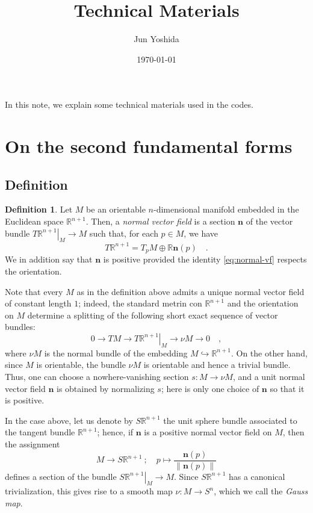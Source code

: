 \documentclass[pdftex,a4paper,12pt]{scrartcl}
\title{Technical Materials}
\author{Jun Yoshida}
\date{\today}
\theoremstyle{plain}
\theoremstyle{definition}
\newtheorem{definition}{Definition}
\theoremstyle{remark}
\numberwithin{equation}{section}
\begin{document}
\maketitle

In this note, we explain some technical materials used in the codes.

\tableofcontents

\section{On the second fundamental forms}

\subsection{Definition}

\begin{definition}
Let $M$ be an orientable $n$-dimensional manifold embedded in the Euclidean space $\mathbb R^{n+1}$.
Then, a \emph{normal vector field} is a section $\mathbf n$ of the vector bundle $\left.T\mathbb R^{n+1}\right|_M\to M$ such that, for each $p\in M$, we have
\begin{equation}
\label{eq:normal-vf}
T\mathbb R^{n+1}= T_pM\oplus \mathbb R\mathbf n(p)
\quad.
\end{equation}
We in addition say that $\mathbf n$ is positive provided the identity \eqref{eq:normal-vf} respects the orientation.
\end{definition}

Note that every $M$ as in the definition above admits a unique normal vector field of constant length $1$; indeed, the standard metrin con $\mathbb R^{n+1}$ and the orientation on $M$ determine a splitting of the following short exact sequence of vector bundles:
\[
0\to TM\to \left.T\mathbb R^{n+1}\right|_M \to \nu M\to 0
\quad,
\]
where $\nu M$ is the normal bundle of the embedding $M\hookrightarrow\mathbb R^{n+1}$.
On the other hand, since $M$ is orientable, the bundle $\nu M$ is orientable and hence a trivial bundle.
Thus, one can choose a nowhere-vanishing section $s:M\to \nu M$, and a unit normal vector field $\mathbf n$ is obtained by normalizing $s$; here is only one choice of $\mathbf n$ so that it is positive.

In the case above, let us denote by $S\mathbb R^{n+1}$ the unit sphere bundle associated to the tangent bundle $\mathbb R^{n+1}$; hence, if $\mathbf n$ is a positive normal vector field on $M$, then the assignment
\[
M \to S\mathbb R^{n+1}
\ ;\quad p\mapsto \frac{\mathbf n(p)}{\|\mathbf n(p)\|}
\]
defines a section of the bundle $\left. S\mathbb R^{n+1}\right|_M\to M$.
Since $S\mathbb R^{n+1}$ has a canonical trivialization, this gives rise to a smooth map $\nu:M\to S^n$, which we call the \emph{Gauss map}.
\end{document}
